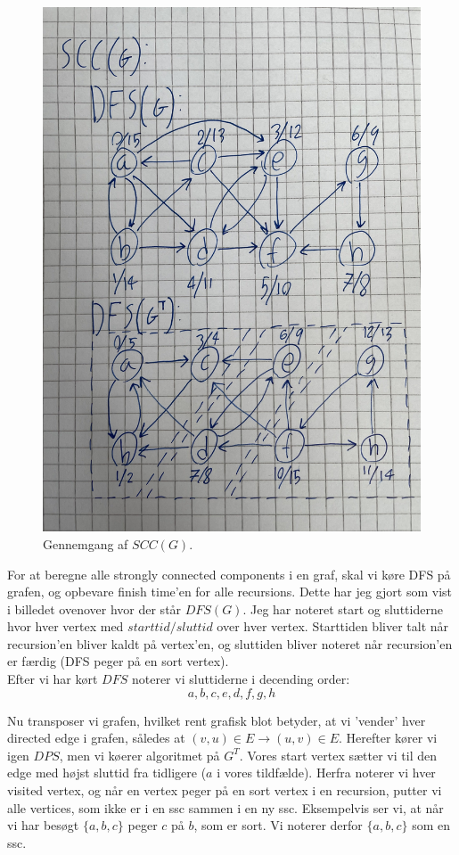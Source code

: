 \documentclass[a4paper,12pt]{article}
\begin{document}
\begin{figure}[H]
    \centering
    \includegraphics[width=1\textwidth]{SCC.jpg}
    \caption{Gennemgang af $SCC(G)$.}
\end{figure}

For at beregne alle strongly connected components i en graf, skal vi køre DFS på grafen, og opbevare finish time'en for alle recursions. Dette har jeg gjort som vist i billedet ovenover hvor der står $DFS(G)$. Jeg har noteret start og sluttiderne hvor hver vertex med $starttid/sluttid$ over hver vertex. Starttiden bliver talt når recursion'en bliver kaldt på vertex'en, og sluttiden bliver noteret når recursion'en er færdig (DFS peger på en sort vertex).\\

Efter vi har kørt $DFS$ noterer vi sluttiderne i decending order:
\[a,b,c,e,d,f,g,h\]

Nu transposer vi grafen, hvilket rent grafisk blot betyder, at vi 'vender' hver directed edge i grafen, således at $(v,u)\in E \rightarrow (u,v)\in E$. Herefter kører vi igen $DPS$, men vi køerer algoritmet på $G^T$. Vores start vertex sætter vi til den edge med højst sluttid fra tidligere ($a$ i vores tildfælde). Herfra noterer vi hver visited vertex, og når en vertex peger på en sort vertex i en recursion, putter vi alle vertices, som ikke er i en ssc sammen i en ny ssc. Eksempelvis ser vi, at når vi har besøgt $\{a,b,c\}$ peger $c$ på $b$, som er sort. Vi noterer derfor $\{a,b,c\}$ som en ssc.
\end{document}
